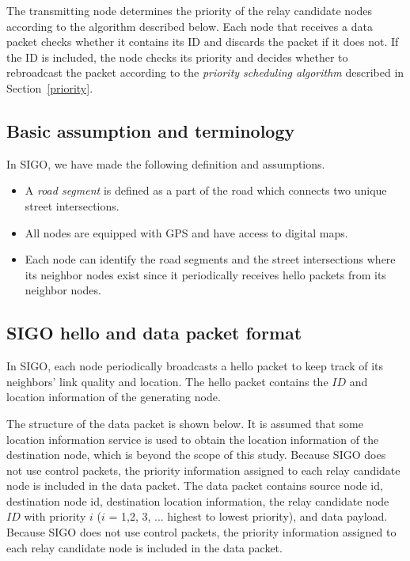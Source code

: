 \documentclass[conference]{IEEEtran}
\begin{document}
The transmitting node determines the priority of the relay candidate nodes according to the algorithm described 
below. Each node that receives a data packet checks whether it contains its ID and discards the packet if it does not. If the ID is included, the node checks its priority and decides whether to rebroadcast the packet according to the \textit{priority scheduling algorithm} described in \mbox{Section \ref{priority}}.

\subsection{Basic assumption and terminology}
In SIGO, we have made the following definition and assumptions.
\begin{itemize}
\item A \textit{road segment} is defined as a part of the road which connects two unique street intersections.
\item All nodes are equipped with GPS and have access to digital maps.
\item Each node can identify the road segments and the street intersections where its neighbor nodes exist since it
periodically receives hello packets from its neighbor nodes.
\end{itemize}


\subsection{SIGO hello and data packet format}
In SIGO, each node periodically broadcasts a hello packet to keep track of its neighbors' link quality and location. 
The hello packet contains the $ID$ and location information of the generating node.


The structure of the data packet is shown below. 
It is assumed that some location information service is used to obtain the location information of the destination node, which is beyond the scope of this study. 
Because SIGO does not use control packets, the priority information assigned to each relay candidate node is included in the data packet.
The data packet contains source node id, destination node id, destination location information, the relay candidate node $ID$ with priority $i$ ($ i$ = 1,2, 3, ... highest to lowest priority), and data payload. Because SIGO does not use control packets, the priority information assigned to each relay candidate node is included in the data packet.
\end{document}

